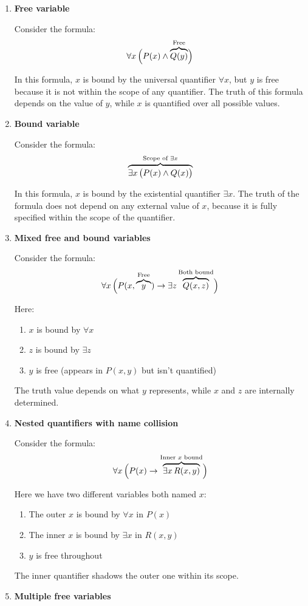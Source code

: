 \documentclass[12pt,a4paper,openany]{article}
\begin{document}
\begin{enumerate}
\item
    \textbf{Free variable}

    Consider the formula:
    \[
    \forall x \, \Big(
    P(x) \wedge
    {\color{black}\overbrace{\color{black}Q(y)}^{\color{black}\text{Free}}}
    \Big)
    \]

    In this formula, $x$ is bound by the universal quantifier $\forall x$, but $y$ is free because it is not within the scope of any quantifier. The truth of this formula depends on the value of $y$, while $x$ is quantified over all possible values.
\item
    \textbf{Bound variable}

    Consider the formula:
    \[
    {\color{black}\overbrace{\color{black}\exists x\,
    \big(
    P(x) \wedge Q(x)
    \big)
    }^{\color{black}\text{Scope of } \exists x}}
    \]

    In this formula, $x$ is bound by the existential quantifier $\exists x$. The truth of the formula does not depend on any external value of $x$, because it is fully specified within the scope of the quantifier.
\item
    \textbf{Mixed free and bound variables}

    Consider the formula:
    \[
    \forall x \, \Big(
    P(x, {\color{black}\overbrace{\color{black}y}^{\color{black}\text{Free}}}) \to
    \exists z \,
    {\color{black}\overbrace{\color{black}Q(x, z)}^{\color{black}\text{Both bound}}}
    \Big)
    \]

    Here:
    \begin{enumerate}
        \item $x$ is bound by $\forall x$
        \item $z$ is bound by $\exists z$
        \item $y$ is free (appears in $P(x,y)$ but isn't quantified)
    \end{enumerate}
    The truth value depends on what $y$ represents, while $x$ and $z$ are internally determined.
\item
    \textbf{Nested quantifiers with name collision}

    Consider the formula:
    \[
    \forall x \, \Big(
    P(x) \to
    {\color{black}\overbrace{\color{black}\exists x \, R(x, y)}^{\color{black}\text{Inner } x \text{ bound}}}
    \Big)
    \]

    Here we have two different variables both named $x$:
    \begin{enumerate}
        \item The outer $x$ is bound by $\forall x$ in $P(x)$
        \item The inner $x$ is bound by $\exists x$ in $R(x,y)$
        \item $y$ is free throughout
    \end{enumerate}
    The inner quantifier shadows the outer one within its scope.
\item
    \textbf{Multiple free variables}


\end{enumerate}
\end{document}
